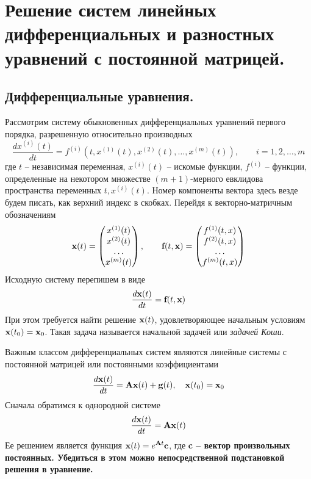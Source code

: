 \section{Решение систем линейных дифференциальных и разностных уравнений с постоянной матрицей.}\label{sec:ch18}

\subsection{Дифференциальные уравнения.}
Рассмотрим систему обыкновенных дифференциальных уравнений первого порядка, разрешенную относительно производных
\begin{equation*}
    \frac{dx^{(i)}(t)}{dt} = f^{(i)}\left( t, x^{(1)}(t), x^{(2)}(t), \dots, x^{(m)}(t) \right), \qquad i=1,2,\ldots,m
\end{equation*}
где $t$ -- независимая переменная, $\displaystyle x^{(i)}(t)$ -- искомые функции, $\displaystyle f^{(i)}$ -- функции,
определенные на некотором множестве $(m+1)$-мерного евклидова пространства переменных $t, x^{(i)}(t)$. Номер компоненты
вектора здесь везде будем писать, как верхний индекс в скобках. Перейдя к векторно-матричным обозначениям
\begin{equation*}
    \bf{x}(t) =
    \begin{pmatrix}
        x^{(1)}(t) \\
        x^{(2)}(t) \\
        \dots      \\
        x^{(m)}(t)
    \end{pmatrix}
    , \qquad
    \bf{f}(t, \bf{x}) =
    \begin{pmatrix}
        f^{(1)}(t, x) \\
        f^{(2)}(t, x) \\
        \dots         \\
        f^{(m)}(t, x) \\
    \end{pmatrix}
\end{equation*}
Исходную систему перепишем в виде
\begin{equation}
    \frac{d\bf{x}(t)}{dt} = \bf{f}(t, \bf{x}) \label{eq:matrix_differential_equation_definition}
\end{equation}
При этом требуется найти решение $\bf{x}(t)$, удовлетворяющее начальным условиям $\displaystyle \bf{x}(t_0) = \bf{x}_0$.
Такая задача называется начальной задачей или \emph{задачей Коши}.

Важным классом дифференциальных систем являются линейные системы с постоянной матрицей или постоянными коэффициентами
\begin{equation}
    \frac{d\bf{x}(t)}{dt} = \bf{A}\bf{x}(t) + \bf{g}(t), \quad \bf{x}(t_0) = \bf{x}_0
\end{equation}
Сначала обратимся к однородной системе
\begin{equation*}
    \frac{d\bf{x}(t)}{dt} = \bf{A}\bf{x}(t)
\end{equation*}
Ее решением является функция $\displaystyle \bf{x}(t) = e^{\bf{A}t} \bf{c}$, где \bf{c} -- вектор произвольных постоянных.
Убедиться в этом можно непосредственной подстановкой решения в уравнение.
\vspace{10pt}

